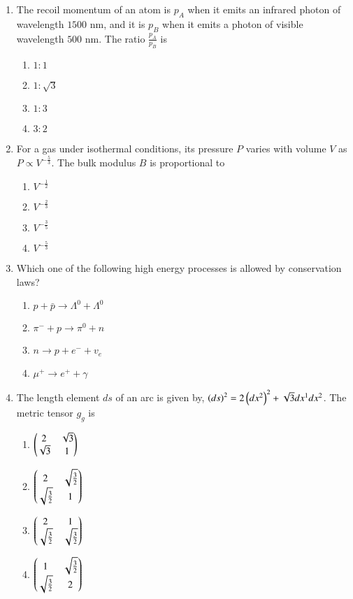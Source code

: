 \documentclass[journal,12pt,onecolumn]{IEEEtran}
\theoremstyle{remark}
\begin{document}
\begin{enumerate}[start=14]
\item The recoil momentum of an atom is $p_A$ when it emits an infrared photon of wavelength $1500$ nm, and it is $p_B$ when it emits a photon of visible wavelength $500$ nm. The ratio $\frac{p_A}{p_B}$ is
\hfill{}
\begin{enumerate}
\item $1:1$
\item $1:\sqrt{3}$
\item $1:3$
\item $3:2$
\end{enumerate}

\item For a gas under isothermal conditions, its pressure $P$ varies with volume $V$ as $P \propto V^{-\frac{5}{3}}$. The bulk modulus $B$ is proportional to
\hfill{}
\begin{enumerate}
\item $V^{-\frac{1}{2}}$
\item $V^{-\frac{2}{3}}$
\item $V^{-\frac{3}{5}}$
\item $V^{-\frac{5}{3}}$
\end{enumerate}

\item Which one of the following high energy processes is allowed by conservation laws?
\hfill{}
\begin{enumerate}
\item $p + \bar{p} \to \Lambda^0 + \Lambda^0$
\item $\pi^- + p \to \pi^0 + n$
\item $n \to p + e^- + v_e$
\item $\mu^+ \to e^+ + \gamma$
\end{enumerate}

\item The length element $ds$ of an arc is given by, $\left(ds\right)^2 = 2\left(dx^2\right)^2 + \sqrt{3}dx^1dx^2$. The metric tensor $g_g$ is
\hfill{}
\begin{enumerate}
\item $\begin{pmatrix}2 & \sqrt{3}\\\sqrt{3} & 1\end{pmatrix}$
\item $\begin{pmatrix}2 & \sqrt{\frac{3}{2}}\\\sqrt{\frac{3}{2}} & 1\end{pmatrix}$
\item $\begin{pmatrix}2 & 1\\\sqrt{\frac{3}{2}} & \sqrt{\frac{3}{2}}\end{pmatrix}$
\item $\begin{pmatrix}1 & \sqrt{\frac{3}{2}}\\\sqrt{\frac{3}{2}} & 2\end{pmatrix}$
\end{enumerate}


\end{enumerate}
\end{document}
